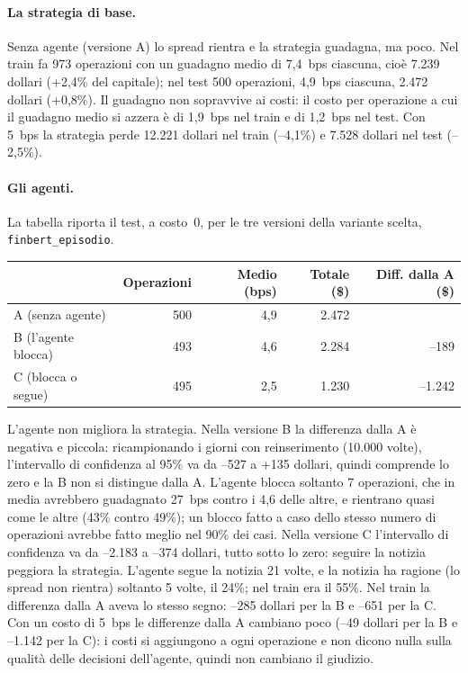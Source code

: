 \documentclass[11pt,a4paper]{article}
\begin{document}
\paragraph{La strategia di base.} Senza agente (versione A) lo spread rientra e la strategia guadagna, ma poco. Nel train fa 973 operazioni con un guadagno medio di 7,4~bps ciascuna, cioè 7.239 dollari (+2,4\% del capitale); nel test 500 operazioni, 4,9~bps ciascuna, 2.472 dollari (+0,8\%). Il guadagno non sopravvive ai costi: il costo per operazione a cui il guadagno medio si azzera è di 1,9~bps nel train e di 1,2~bps nel test. Con 5~bps la strategia perde 12.221 dollari nel train (--4,1\%) e 7.528 dollari nel test (--2,5\%).

\paragraph{Gli agenti.} La tabella riporta il test, a costo~0, per le tre versioni della variante scelta, \texttt{finbert\_episodio}.
\begin{table}[h]
\centering\small
\begin{tabular}{lrrrr}
\toprule
 & Operazioni & Medio (bps) & Totale (\$) & Diff. dalla A (\$) \\
\midrule
A (senza agente)      & 500 & 4,9 & 2.472 & \\
B (l'agente blocca)   & 493 & 4,6 & 2.284 & --189 \\
C (blocca o segue)    & 495 & 2,5 & 1.230 & --1.242 \\
\bottomrule
\end{tabular}
\end{table}
L'agente non migliora la strategia. Nella versione B la differenza dalla A è negativa e piccola: ricampionando i giorni con reinserimento (10.000 volte), l'intervallo di confidenza al 95\% va da --527 a +135 dollari, quindi comprende lo zero e la B non si distingue dalla A. L'agente blocca soltanto 7 operazioni, che in media avrebbero guadagnato 27~bps contro i 4,6 delle altre, e rientrano quasi come le altre (43\% contro 49\%); un blocco fatto a caso dello stesso numero di operazioni avrebbe fatto meglio nel 90\% dei casi. Nella versione C l'intervallo di confidenza va da --2.183 a --374 dollari, tutto sotto lo zero: seguire la notizia peggiora la strategia. L'agente segue la notizia 21 volte, e la notizia ha ragione (lo spread non rientra) soltanto 5 volte, il 24\%; nel train era il 55\%. Nel train la differenza dalla A aveva lo stesso segno: --285 dollari per la B e --651 per la C. Con un costo di 5~bps le differenze dalla A cambiano poco (--49 dollari per la B e --1.142 per la C): i costi si aggiungono a ogni operazione e non dicono nulla sulla qualità delle decisioni dell'agente, quindi non cambiano il giudizio.
\end{document}

